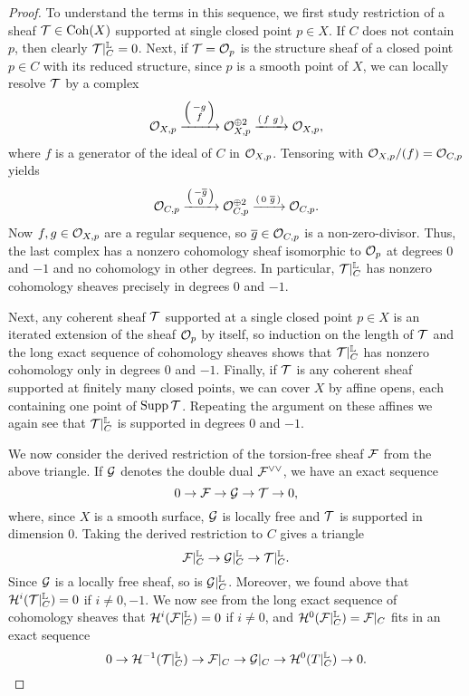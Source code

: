 \documentclass[letterpaper,11pt]{amsart}%
\theoremstyle{remark}
\begin{document}
\begin{proof}

\iffalse To understand the terms in this sequence, we first study restriction of a sheaf $\mathcal{T} \in \mathrm{Coh}(X)$ supported at single closed point $p \in X$. If $C$ does not contain $p$, then clearly $\mathcal{T}|_C^{\mathbb{L}} = 0$. Next, if $\mathcal{T} = \mathcal{O}_p$ is the structure sheaf of a closed point $p \in C$ with its reduced structure, since $p$ is a smooth point of $X$, we can locally resolve $\mathcal{T}$ by a complex
\[ \mathcal{O}_{X,p} \xrightarrow{\left(\begin{smallmatrix}-g\\f\end{smallmatrix}\right)} \mathcal{O}_{X,p}^{\oplus 2} \xrightarrow{\left(\begin{smallmatrix}f&g\end{smallmatrix}\right)} \mathcal{O}_{X,p}, \]
where $f$ is a generator of the ideal of $C$ in $\mathcal{O}_{X,p}$. Tensoring with $\mathcal{O}_{X,p}/(f) = \mathcal{O}_{C,p}$ yields
\[ \mathcal{O}_{C,p} \xrightarrow{\left(\begin{smallmatrix}-\overline{g}\\0\end{smallmatrix}\right)} \mathcal{O}_{C,p}^{\oplus 2} \xrightarrow{\left(\begin{smallmatrix}0&\overline{g}\end{smallmatrix}\right)} \mathcal{O}_{C,p}. \]
Now $f, g \in \mathcal{O}_{X,p}$ are a regular sequence, so $\overline{g} \in \mathcal{O}_{C,p}$ is a non-zero-divisor. Thus, the last complex has a nonzero cohomology sheaf isomorphic to $\mathcal{O}_p$ at degrees $0$ and $-1$ and no cohomology in other degrees. In particular, $\mathcal{T}|_C^{\mathbb{L}}$ has nonzero cohomology sheaves precisely in degrees $0$ and $-1$.

Next, any coherent sheaf $\mathcal{T}$ supported at a single closed point $p \in X$ is an iterated extension of the sheaf $\mathcal{O}_p$ by itself, so induction on the length of $\mathcal{T}$ and the long exact sequence of cohomology sheaves shows that $\mathcal{T}|_C^{\mathbb{L}}$ has nonzero cohomology only in degrees $0$ and $-1$. Finally, if $\mathcal{T}$ is any coherent sheaf supported at finitely many closed points, we can cover $X$ by affine opens, each containing one point of $\operatorname{\mathrm{Supp}} \mathcal{T}$. Repeating the argument on these affines we again see that $\mathcal{T}|_C^{\mathbb{L}}$ is supported in degrees $0$ and $-1$.

We now consider the derived restriction of the torsion-free sheaf $\mathcal{F}$ from the above triangle. If $\mathcal{G}$ denotes the double dual $\mathcal{F}^{\vee\vee}$, we have an exact sequence
\[ 0 \to \mathcal{F} \to \mathcal{G} \to \mathcal{T} \to 0, \]
where, since $X$ is a smooth surface, $\mathcal{G}$ is locally free and $\mathcal{T}$ is supported in dimension 0. Taking the derived restriction to $C$ gives a triangle
\[ \mathcal{F}|_C^{\mathbb{L}} \to \mathcal{G}|_C^{\mathbb{L}} \to \mathcal{T}|_C^{\mathbb{L}}. \]
Since $\mathcal{G}$ is a locally free sheaf, so is $\mathcal{G}|_C^{\mathbb{L}}$. Moreover, we found above that $\mathcal{H}^i(\mathcal{T}|_C^{\mathbb{L}}) = 0$ if $i \neq 0,-1$. We now see from the long exact sequence of cohomology sheaves that $\mathcal{H}^i(\mathcal{F}|_C^{\mathbb{L}}) = 0$ if $i \neq 0$, and $\mathcal{H}^0(\mathcal{F}|_C^{\mathbb{L}}) = \mathcal{F}|_C$ fits in an exact sequence
\[ 0 \to \mathcal{H}^{-1}(\mathcal{T}|_C^{\mathbb{L}}) \to \mathcal{F}|_C \to \mathcal{G}|_C \to \mathcal{H}^0(T|_C^{\mathbb{L}}) \to 0. \]


\end{proof}
\end{document}
